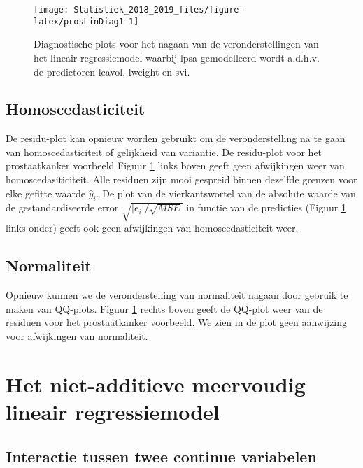 \documentclass[12pt,dutch,coursenotes]{book}
\theoremstyle{definition}
\theoremstyle{definition}
\theoremstyle{definition}
\theoremstyle{remark}
\begin{document}
\begin{figure}

{\centering \texttt{[image: Statistiek\_2018\_2019\_files/figure-latex/prosLinDiag1-1]} 

}

\caption{Diagnostische plots voor het nagaan van de veronderstellingen van het lineair regressiemodel waarbij lpsa gemodelleerd wordt a.d.h.v. de predictoren lcavol, lweight en svi.}\label{fig:prosLinDiag1}
\end{figure}

\subsection{Homoscedasticiteit}\label{homoscedasticiteit}

De residu-plot kan opnieuw worden gebruikt om de veronderstelling na te
gaan van homoscedasticiteit of gelijkheid van variantie. De residu-plot
voor het prostaatkanker voorbeeld Figuur \ref{fig:prosLinDiag1} links
boven geeft geen afwijkingen weer van homoscedasiticiteit. Alle residuen
zijn mooi gespreid binnen dezelfde grenzen voor elke gefitte waarde
\(\hat y_i\). De plot van de vierkantswortel van de absolute waarde van
de gestandardiseerde error \(\sqrt{|e_i|/\sqrt{MSE}}\) in functie van de
predicties (Figuur \ref{fig:prosLinDiag1} links onder) geeft ook geen
afwijkingen van homoscedasticiteit weer.

\subsection{Normaliteit}\label{normaliteit}

Opnieuw kunnen we de veronderstelling van normaliteit nagaan door
gebruik te maken van QQ-plots. Figuur \ref{fig:prosLinDiag1} rechts
boven geeft de QQ-plot weer van de residuen voor het prostaatkanker
voorbeeld. We zien in de plot geen aanwijzing voor afwijkingen van
normaliteit.

\section{Het niet-additieve meervoudig lineair
regressiemodel}\label{het-niet-additieve-meervoudig-lineair-regressiemodel}

\subsection{Interactie tussen twee continue
variabelen}\label{sec:intCont}
\end{document}
